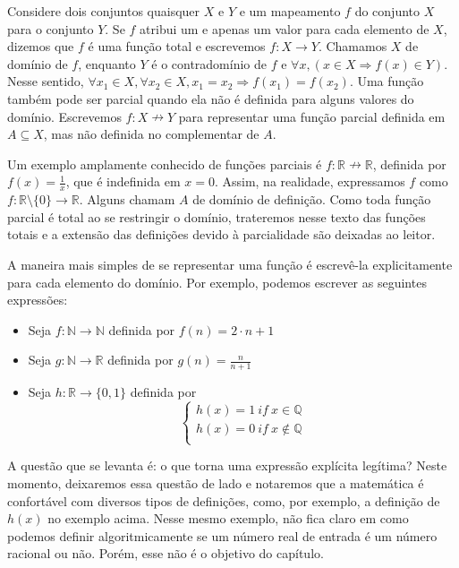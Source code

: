 Considere dois conjuntos quaisquer $X$ e $Y$ e um mapeamento $f$
do conjunto $X$ para o conjunto $Y$. Se $f$ atribui um e apenas
um valor para cada elemento de $X$, dizemos que $f$ é uma função total e
escrevemos $f: X \to Y$.  Chamamos $X$ de domínio de $f$, enquanto
$Y$ é o contradomínio de $f$ e $\forall x, (x \in X  \Rightarrow f(x) \in Y)$.
Nesse sentido, $\forall x_1 \in X, \forall x_2 \in X, x_1 = x_2 \Rightarrow f(x_1) = f(x_2)$.
Uma função também pode ser parcial quando ela não é definida para alguns valores
do domínio. Escrevemos $f: X \nrightarrow Y $ para representar uma função parcial definida em 
$A \subseteq X $, mas não definida no complementar de $A$. 

Um exemplo amplamente conhecido de funções parciais é $f: \mathbb{R} \nrightarrow \mathbb{R}$, 
definida por $f(x) = \frac{1}{x}$, que é indefinida em $x = 0$. Assim, na realidade, expressamos $f$ como
$f : \mathbb{R} \setminus \{0\} \to \mathbb{R}$. Alguns chamam $A$ de domínio de definição. 
Como toda função parcial é total ao se restringir o domínio, trateremos nesse texto das funções totais 
e a extensão das definições devido à parcialidade são deixadas ao leitor.  

A maneira mais simples de se representar uma função é escrevê-la explicitamente
para cada elemento do domínio. Por exemplo, podemos escrever as seguintes expressões:

\begin{itemize}
    \item Seja $f: \mathbb{N} \to \mathbb{N}$ definida por
    $f(n) = 2\cdot n + 1$
    \item Seja $g : \mathbb{N} \to \mathbb{R}$ definida por
    $g(n) = \frac{n}{n+1}$
    \item Seja $h : \mathbb{R} \to \{0,1\}$ definida por
    $$\left \{ \begin{array}{c}
    h(x) = 1 ~if~x \in \mathbb{Q} \\
    h(x) = 0 ~ if ~ x \not \in \mathbb{Q} \\
    \end{array}
    \right. $$
 \end{itemize}

A questão que se levanta é: o que torna uma expressão explícita legítima?
Neste momento, deixaremos essa questão de lado e notaremos que a matemática
é confortável com diversos tipos de definições, como, por exemplo, a definição
de $h(x)$ no exemplo acima. Nesse mesmo exemplo, não fica claro em como podemos
definir algoritmicamente se um número real de entrada é um número racional ou não.
Porém, esse não é o objetivo do capítulo.


